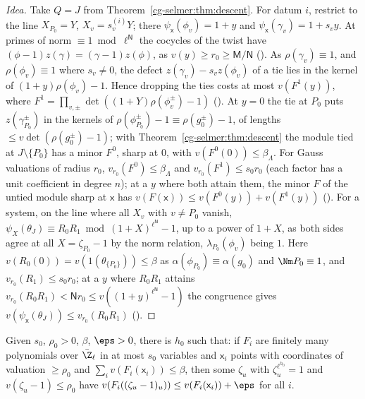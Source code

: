 \begin{proof}[Idea]
Take $Q=J$ from Theorem~\ref{cg-selmer:thm:descent}. For datum $i$, restrict to the line
$X_{P_0}=Y$, $X_v=s^{(i)}_vY$; there $\psi_{\mathsf x}(\phi_v)=1+y$ and $\psi_{\mathsf x}(\gamma_v)=1+s_vy$. At primes of
norm $\equiv1\bmod\ell^{\mathsf N}$ the cocycles of the twist have $(\phi-1)z(\gamma)=(\gamma-1)z(\phi)$, as
$v(y)\ge r_0\ge\mathsf M/\mathsf N$ (). As $\rho(\gamma_v)\equiv1$, and
$\rho(\phi_v)\equiv1$ where $s_v\ne0$, the defect $z(\gamma_v)-s_vz(\phi_v)$ of a tie lies in the
kernel of $(1+y)\rho(\phi_v)-1$. Hence dropping the ties costs at most $v(F^1(y))$, where
$F^1=\prod_{v,\pm}\det((1+Y)\rho(\phi_v^\pm)-1)$ ().
At $y=0$ the tie at $P_0$ puts $z(\gamma_{P_0}^\pm)$ in the kernels of
$\rho(\phi_{P_0}^\pm)-1\equiv\rho(g_0^\pm)-1$, of lengths $\le v\det(\rho(g_0^\pm)-1)$; with
Theorem~\ref{cg-selmer:thm:descent} the module tied at $J\setminus\{P_0\}$ has a minor
$F^0$, sharp at $0$, with $v(F^0(0))\le\beta_\Lambda$. For Gauss valuations of radius $r_0$,
$v_{r_0}(F^0)\le\beta_\Lambda$ and $v_{r_0}(F^1)\le s_0r_0$ (each factor has a unit coefficient in degree
$n$); at a $y$ where both attain them, the minor $F$ of the untied module sharp at $\mathsf x$ has
$v(F(\mathsf x))\le v(F^0(y))+v(F^1(y))$ ().
For a system, on the line where all $X_v$ with $v\ne P_0$ vanish, $\psi_X(\theta_J)\equiv R_0R_1\bmod
(1+X)^{\ell^{\mathsf N}}-1$, up to a power of $1+X$, as both sides agree at all $X=\zeta_{P_0}-1$ by the norm
relation, $\lambda_{P_0}(\phi_v)$ being $1$. Here $v(R_0(0))=v(1(\theta_{\{P_0\}}))\le\beta$ as
$\alpha(\phi_{P_0})\equiv\alpha(g_0)$ and $\Nm P_0\equiv1$, and
$v_{r_0}(R_1)\le s_0r_0$; at a $y$ where $R_0R_1$ attains $v_{r_0}(R_0R_1)<\mathsf Nr_0\le
v((1+y)^{\ell^{\mathsf N}}-1)$ the congruence gives $v(\psi_{\mathsf x}(\theta_J))\le v_{r_0}(R_0R_1)$
().
\end{proof}

\begin{theorem}
\label{cg-selmer:thm:roots}
Given $s_0$, $\rho_0>0$, $\beta$, $\eps>0$, there is $h_0$ such that: if $F_i$ are finitely many
polynomials over $\bar\Z_\ell$ in at most $s_0$ variables and $\mathsf x_i$ points with coordinates of
valuation $\ge\rho_0$ and $\sum_iv(F_i(\mathsf x_i))\le\beta$, then some $\zeta_u$ with $\zeta_u^{\ell^{h_0}}=1$
and $v(\zeta_u-1)\le\rho_0$ have $v(F_i((\zeta_u-1)_u))\le v(F_i(\mathsf x_i))+\eps$ for all $i$.
\end{theorem}


